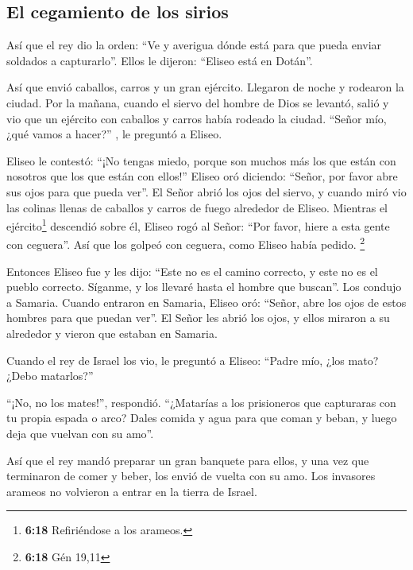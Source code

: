 \hypertarget{el-cegamiento-de-los-sirios}{%
\subsection{El cegamiento de los
sirios}\label{el-cegamiento-de-los-sirios}}

 Así que el rey dio la orden: ``Ve y averigua dónde está
para que pueda enviar soldados a capturarlo''. Ellos le dijeron:
``Eliseo está en Dotán''.

 Así que envió caballos, carros y un gran ejército.
Llegaron de noche y rodearon la ciudad.  Por la mañana,
cuando el siervo del hombre de Dios se levantó, salió y vio que un
ejército con caballos y carros había rodeado la ciudad. ``Señor mío,
¿qué vamos a hacer?'' , le preguntó a Eliseo.

 Eliseo le contestó: ``¡No tengas miedo, porque son
muchos más los que están con nosotros que los que están con ellos!''
 Eliseo oró diciendo: ``Señor, por favor abre sus ojos
para que pueda ver''. El Señor abrió los ojos del siervo, y cuando miró
vio las colinas llenas de caballos y carros de fuego alrededor de
Eliseo.  Mientras el ejército\footnote{\textbf{6:18}
  Refiriéndose a los arameos.} descendió sobre él, Eliseo rogó al Señor:
``Por favor, hiere a esta gente con ceguera''. Así que los golpeó con
ceguera, como Eliseo había pedido. \footnote{\textbf{6:18} Gén 19,11}

 Entonces Eliseo fue y les dijo: ``Este no es el camino
correcto, y este no es el pueblo correcto. Síganme, y los llevaré hasta
el hombre que buscan''. Los condujo a Samaria.  Cuando
entraron en Samaria, Eliseo oró: ``Señor, abre los ojos de estos hombres
para que puedan ver''. El Señor les abrió los ojos, y ellos miraron a su
alrededor y vieron que estaban en Samaria.

 Cuando el rey de Israel los vio, le preguntó a Eliseo:
``Padre mío, ¿los mato? ¿Debo matarlos?''

 ``¡No, no los mates!'', respondió. ``¿Matarías a los
prisioneros que capturaras con tu propia espada o arco? Dales comida y
agua para que coman y beban, y luego deja que vuelvan con su amo''.

 Así que el rey mandó preparar un gran banquete para
ellos, y una vez que terminaron de comer y beber, los envió de vuelta
con su amo. Los invasores arameos no volvieron a entrar en la tierra de
Israel.

